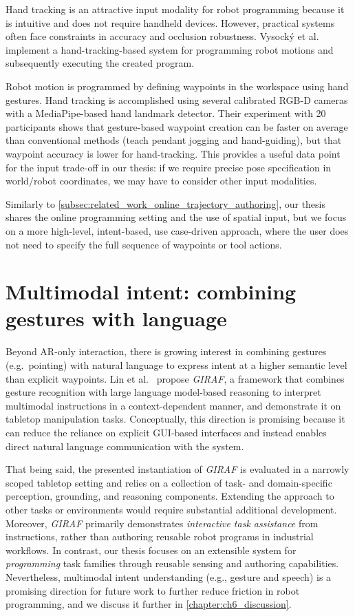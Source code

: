 Hand tracking is an attractive input modality for robot programming because it is intuitive and does not require handheld devices. However, practical systems often face constraints in accuracy and occlusion robustness. Vysocký et al.~\cite{Vysocky2023} implement a hand-tracking-based system for programming robot motions and subsequently executing the created program.

Robot motion is programmed by defining waypoints in the workspace using hand gestures. Hand tracking is accomplished using several calibrated RGB-D cameras with a MediaPipe-based \cite{MediaPipeRoot} hand landmark detector. Their experiment with 20 participants shows that gesture-based waypoint creation can be faster on average than conventional methods (teach pendant jogging and hand-guiding), but that waypoint accuracy is lower for hand-tracking. This provides a useful data point for the input trade-off in our thesis: if we require precise pose specification in world/robot coordinates, we may have to consider other input modalities.

Similarly to \autoref{subsec:related_work_online_trajectory_authoring}, our thesis shares the online programming setting and the use of spatial input, but we focus on a more high-level, intent-based, use case-driven approach, where the user does not need to specify the full sequence of waypoints or tool actions.

\section{Multimodal intent: combining gestures with language}

Beyond AR-only interaction, there is growing interest in combining gestures (e.g.\ pointing) with natural language to express intent at a higher semantic level than explicit waypoints. Lin et al.~\cite{Lin2023} propose \emph{GIRAF}, a framework that combines gesture recognition with large language model-based reasoning to interpret multimodal instructions in a context-dependent manner, and demonstrate it on tabletop manipulation tasks. Conceptually, this direction is promising because it can reduce the reliance on explicit GUI-based interfaces and instead enables direct natural language communication with the system.

That being said, the presented instantiation of \emph{GIRAF} is evaluated in a narrowly scoped tabletop setting and relies on a collection of task- and domain-specific perception, grounding, and reasoning components. Extending the approach to other tasks or environments would require substantial additional development. Moreover, \emph{GIRAF} primarily demonstrates \emph{interactive task assistance} from instructions, rather than authoring reusable robot programs in industrial workflows. In contrast, our thesis focuses on an extensible system for \emph{programming} task families through reusable sensing and authoring capabilities. Nevertheless, multimodal intent understanding (e.g., gesture and speech) is a promising direction for future work to further reduce friction in robot programming, and we discuss it further in \autoref{chapter:ch6_discussion}.

